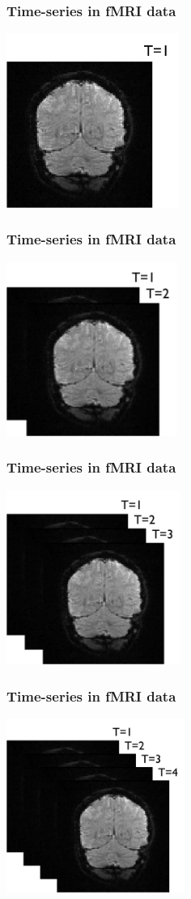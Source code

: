 \documentclass{beamer}
\begin{document}
\begin{frame}
\frametitle{Time-series in fMRI data}
\includegraphics[height=5.7cm]{figures/t1}
\end{frame}

\begin{frame}
\frametitle{Time-series in fMRI data}
\includegraphics[height=5.7cm]{figures/t1_2}
\end{frame}

\begin{frame}
\frametitle{Time-series in fMRI data}
\includegraphics[height=5.7cm]{figures/t1_2_3}
\end{frame}

\begin{frame}
\frametitle{Time-series in fMRI data}
\includegraphics[height=5.7cm]{figures/t1_2_3_4}
\end{frame}
\end{document}
